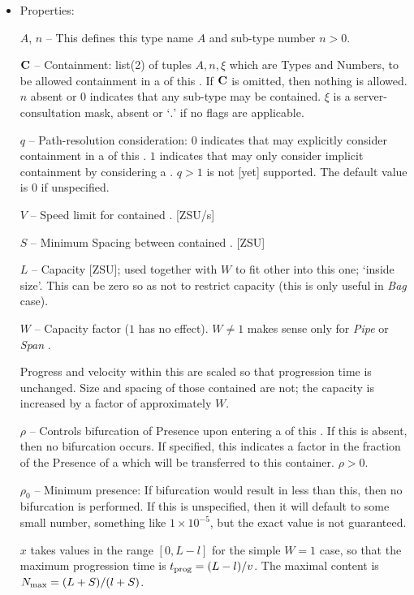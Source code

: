 \begin{itemize}
  \item Properties:

    $A$, $n$ -- This  defines this type name $A$ and sub-type number $n>0$. 
    
    ${\bf C}$ -- Containment: list(2) of tuples $A,n,\xi$ which are  Types and Numbers,
    to be allowed containment in a  of this .
    If ${\bf C}$ is omitted, then nothing is allowed. $n$ absent or $0$ indicates that any sub-type may be contained.
    $\xi$ is a server-consultation mask, absent or `$.$' if no flags are applicable.
    
    $q$ -- Path-resolution consideration: $0$ indicates that  may explicitly consider
    containment in a  of this . $1$ indicates that  may only
    consider implicit containment by considering a . $q>1$ is not [yet] supported.
    The default value is $0$ if unspecified.
    
    $V$ -- Speed limit for contained . [ZSU/s]

    $S$ -- Minimum Spacing between contained . [ZSU]
    
    $L$ -- Capacity [ZSU]; used together with $W$ to fit other  into this
    one; `inside size'. This can be zero so as not to restrict capacity (this is only useful in \emph{Bag} case).

    $W$ -- Capacity factor ($1$ has no effect). $W\neq1$ makes sense only for \emph{Pipe} or \emph{Span} .

    Progress and velocity within this  are scaled so that progression time is unchanged.
    Size and spacing of those contained are not; the capacity is increased by a factor of approximately $W$.

    $\rho$ -- Controls bifurcation of Presence upon entering a  of this .
    If this is absent, then no bifurcation occurs. If specified, this indicates a factor in the fraction
    of the Presence of a  which will be transferred to this container. $\rho>0$.

    $\rho_0$ -- Minimum presence: If bifurcation would result in less than this, then no bifurcation is performed.
    If this is unspecified, then it will default to some small number, something like $1\times10^{-5}$, but the exact
    value is not guaranteed.
    
    $x$ takes values in the range $[0,L-l]$ for the simple $W=1$ case, so that the maximum progression
    time is $t_{\textup{prog}} = (L-l)/v$. The maximal content is $N_\textup{max} = (L+S)/(l+S)$.


\end{itemize}
